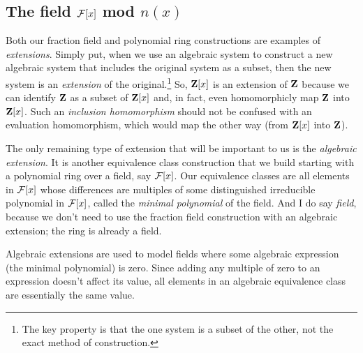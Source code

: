 \begin{comment}
Such fields, which share some properties of both purely infinite and
finite fields, are called {\it fields of characteristic $p$}, where
$p$ is the order of the prime subfield.  Fields with infinite prime
subfields (isomorphic to {\bf Z}) are called {\it fields of
characteristic zero}).  WHAT ABOUT RINGS OF INFINITE CHARACTERISTIC?

DEFINE ISOMORPHISM.

\end{comment}

\begin{comment}

\mysection{Linear Algebra}
\qquad [van der Waerden], Ch. 4, \S6.11 (trace of an field extension)

Determinants; trace.

\end{comment}

\subsection*{\qquad The field ${\cal F}[x]$ mod $n(x)$}

Both our fraction field and polynomial ring constructions are examples
of {\it extensions}.  Simply put, when we use an algebraic system to
construct a new algebraic system that includes the original system as
a subset, then the new system is an {\it extension} of the
original.\footnote{The key property is that the one system is a subset
of the other, not the exact method of construction.}  So, ${\bf Z}[x]$
is an extension of ${\bf Z}$ because we can identify ${\bf Z}$ as a
subset of ${\bf Z}[x]$ and, in fact, even homomorphicly map ${\bf Z}$
into ${\bf Z}[x]$.  Such an {\it inclusion homomorphism} should not be
confused with an evaluation homomorphism, which would map the other
way (from ${\bf Z}[x]$ into ${\bf Z}$).

The only remaining type of extension that will be important to us is
the {\it algebraic extension}.  It is another equivalence class
construction that we build starting with a polynomial ring over a
field, say ${\cal F}[x]$.  Our equivalence classes are all elements in
${\cal F}[x]$ whose differences are multiples of some distinguished
irreducible polynomial in ${\cal F}[x]$, called the {\it minimal
polynomial} of the field.  And I do say {\it field}, because we don't
need to use the fraction field construction with an algebraic
extension; the ring is already a field.

Algebraic extensions are used to model fields where some algebraic
expression (the minimal polynomial) is zero.  Since adding any
multiple of zero to an expression doesn't affect its value, all
elements in an algebraic equivalence class are essentially the same
value.

